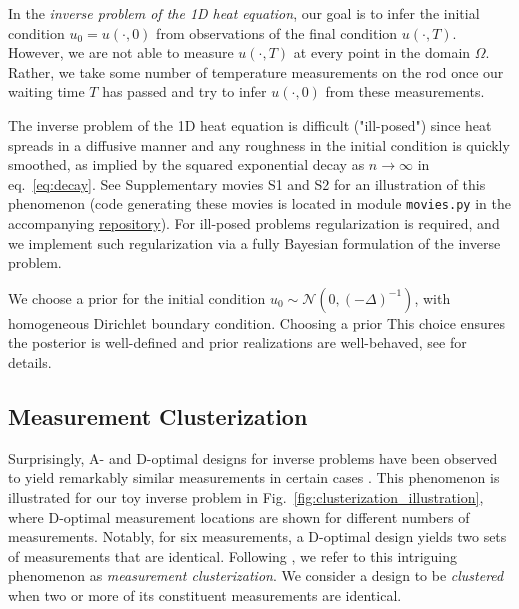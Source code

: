 \documentclass[ba]{imsart}
\theoremstyle{plain}
\theoremstyle{definition}
\theoremstyle{remark}
\begin{document}
In the \emph{inverse problem of the 1D heat equation}, our goal is to
infer the initial condition $u_0 = u(\cdot, 0)$ from observations of
the final condition $u(\cdot, T)$. However, we are not able to measure
$u(\cdot, T)$ at every point in the domain $\Omega$. Rather, we take
some number of temperature measurements on the rod once our waiting
time $T$ has passed and try to infer $u(\cdot, 0)$ from these
measurements.

The inverse problem of the 1D heat equation is difficult ("ill-posed")
since heat spreads in a diffusive manner and any roughness in the
initial condition is quickly smoothed, as implied by the squared
exponential decay as $n\to\infty$ in eq.~\eqref{eq:decay}. See
Supplementary movies S1 and S2 for an illustration of this phenomenon
(code generating these movies is located in module \texttt{movies.py}
in the accompanying
\href{https://github.com/yairdaon/OED}{repository}). For ill-posed
problems regularization is required, and we implement such
regularization via a fully Bayesian formulation of the inverse
problem.

We choose a prior for the initial condition $u_0 \sim \mathcal{N}(0,
(-\Delta)^{-1})$, with homogeneous Dirichlet boundary condition. Choosing a prior This
choice ensures the posterior is well-defined and prior realizations
are well-behaved, see \cite[Theorem 3.1 and Lemma 6.25]{Stuart10} for
details.




\subsection{Measurement Clusterization}
Surprisingly, A- and D-optimal designs for inverse problems have been
observed to yield remarkably similar measurements in certain cases
\cite{fedorovDesignSpatialExperiments1996, nyberg2012, fedorov1997,
  Ucinski05, neitzel2019sparse}. This phenomenon is illustrated for
our toy inverse problem in Fig.~\ref{fig:clusterization_illustration},
where D-optimal measurement locations are shown for different numbers
of measurements. Notably, for six measurements, a D-optimal design
yields two sets of measurements that are identical. Following
\cite{Ucinski05}, we refer to this intriguing phenomenon as
\emph{measurement clusterization}. We consider a design to be
\emph{clustered} when two or more of its constituent measurements are
identical.
\end{document}
